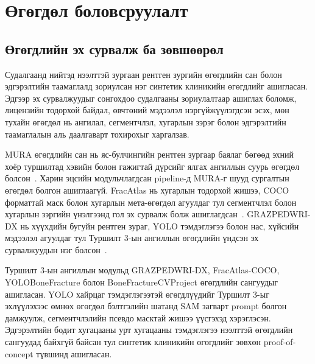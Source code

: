 
\chapter{Өгөгдөл боловсруулалт}
\label{Chapter4}
\pagecolor{Beige}


\section{Өгөгдлийн эх сурвалж ба зөвшөөрөл}

Судалгаанд нийтэд нээлттэй зургаан рентген зургийн өгөгдлийн сан болон эдгэрэлтийн таамаглалд зориулсан нэг синтетик клиникийн өгөгдлийг ашигласан. Эдгээр эх сурвалжуудыг сонгохдоо судалгааны зориулалтаар ашиглах боломж, лицензийн тодорхой байдал, өвчтөний мэдээлэл нэргүйжүүлэгдсэн эсэх, мөн тухайн өгөгдөл нь ангилал, сегментчлэл, хугарлын зэрэг болон эдгэрэлтийн таамаглалын аль даалгаварт тохирохыг харгалзав.

MURA өгөгдлийн сан нь яс-булчингийн рентген зургаар баялаг бөгөөд эхний хоёр туршилтад хэвийн болон гажигтай дүрсийг ялгах ангиллын суурь өгөгдөл болсон~\cite{ref39}. Харин эцсийн модульчлагдсан pipeline-д MURA-г шууд сургалтын өгөгдөл болгон ашиглаагүй. FracAtlas нь хугарлын тодорхой жишээ, COCO форматтай маск болон хугарлын мета-өгөгдөл агуулдаг тул сегментчлэл болон хугарлын зэргийн үнэлгээнд гол эх сурвалж болж ашиглагдсан~\cite{ref40}. GRAZPEDWRI-DX нь хүүхдийн бугуйн рентген зураг, YOLO тэмдэглэгээ болон нас, хүйсийн мэдээлэл агуулдаг тул Туршилт 3-ын ангиллын өгөгдлийн үндсэн эх сурвалжуудын нэг болсон~\cite{ref41}.

Туршилт 3-ын ангиллын модульд GRAZPEDWRI-DX, FracAtlas-COCO, YOLOBoneFracture болон BoneFractureCVProject өгөгдлийн сангуудыг ашигласан. YOLO хайрцаг тэмдэглэгээтэй өгөгдлүүдийг Туршилт 3-ыг эхлүүлэхээс өмнөх өгөгдөл бэлтгэлийн шатанд SAM загварт prompt болгон дамжуулж, сегментчлэлийн псевдо масктай жишээ үүсгэхэд хэрэглэсэн. Эдгэрэлтийн бодит хугацааны урт хугацааны тэмдэглэгээ нээлттэй өгөгдлийн сангуудад байхгүй байсан тул синтетик клиникийн өгөгдлийг зөвхөн proof-of-concept түвшинд ашигласан.

